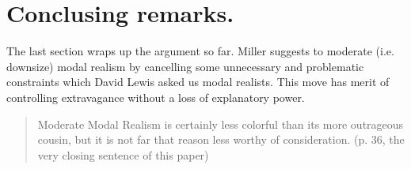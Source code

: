 \documentclass[
10pt, %
a4paper, %
twocolumn, %
landscape %
]{article}
\begin{document}
\section{Conclusing remarks.}
The last section wraps up the argument so far.
Miller suggests to moderate (i.e. downsize) modal realism by cancelling some unnecessary and problematic constraints which David Lewis asked us modal realists.
This move has merit of controlling extravagance without a loss of explanatory power.

\begin{quote}
  Moderate Modal Realism is certainly less colorful than its more outrageous cousin, but it is not far that reason less worthy of consideration. (p. 36, the very closing sentence of this paper)
\end{quote}






\end{document}
